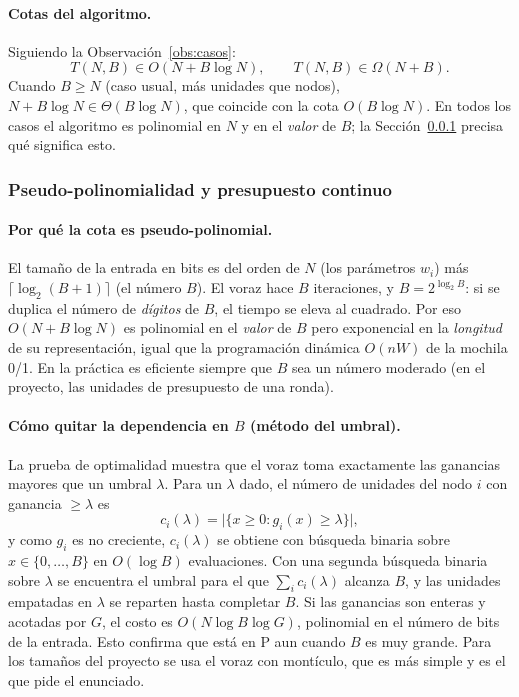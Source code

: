 \paragraph{Cotas del algoritmo.} Siguiendo la Observación~\ref{obs:casos}:
\[
T(N,B)\in O(N + B\log N), \qquad T(N,B)\in\Omega(N + B).
\]
Cuando $B\ge N$ (caso usual, más unidades que nodos), $N + B\log N \in \Theta(B\log N)$, que coincide con la cota $O(B\log N)$. En todos los casos el algoritmo es polinomial en $N$ y en el \emph{valor} de $B$; la Sección~\ref{sec:pseudo} precisa qué significa esto.

\subsubsection{Pseudo-polinomialidad y presupuesto continuo}\label{sec:pseudo}

\paragraph{Por qué la cota es pseudo-polinomial.} El tamaño de la entrada en bits es del orden de $N$ (los parámetros $w_i$) más $\lceil\log_2(B+1)\rceil$ (el número $B$). El voraz hace $B$ iteraciones, y $B = 2^{\log_2 B}$: si se duplica el número de \emph{dígitos} de $B$, el tiempo se eleva al cuadrado. Por eso $O(N+B\log N)$ es polinomial en el \emph{valor} de $B$ pero exponencial en la \emph{longitud} de su representación, igual que la programación dinámica $O(nW)$ de la mochila 0/1. En la práctica es eficiente siempre que $B$ sea un número moderado (en el proyecto, las unidades de presupuesto de una ronda).

\paragraph{Cómo quitar la dependencia en $B$ (método del umbral).} La prueba de optimalidad muestra que el voraz toma exactamente las ganancias mayores que un umbral $\lambda$. Para un $\lambda$ dado, el número de unidades del nodo $i$ con ganancia $\ge\lambda$ es
\[
c_i(\lambda)=\big|\{x\ge 0 : g_i(x)\ge\lambda\}\big|,
\]
y como $g_i$ es no creciente, $c_i(\lambda)$ se obtiene con búsqueda binaria sobre $x\in\{0,\dots,B\}$ en $O(\log B)$ evaluaciones. Con una segunda búsqueda binaria sobre $\lambda$ se encuentra el umbral para el que $\sum_i c_i(\lambda)$ alcanza $B$, y las unidades empatadas en $\lambda$ se reparten hasta completar $B$. Si las ganancias son enteras y acotadas por $G$, el costo es $O(N\log B\log G)$, polinomial en el número de bits de la entrada. Esto confirma que \REP{} está en P aun cuando $B$ es muy grande. Para los tamaños del proyecto se usa el voraz con montículo, que es más simple y es el que pide el enunciado.


